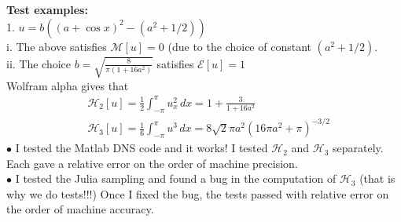 \documentclass[11pt]{article}
\newcommand{\vsp}[1]{\vspace{#1 pc} \noindent}
\newcommand{\seclabel}[1]{\vsp{1} {\bf#1:}}
\newcommand{\dx}{\, dx}
\newcommand{\En}{\mathcal{E}}
\newcommand{\Mo}{\mathcal{M}}
\newcommand{\Ham}{\mathcal{H}}
\newcommand{\Hthree}{\Ham_{3}}
\newcommand{\Htwo}{\Ham_{2}}
\begin{document}
\seclabel{Test examples} \\
1. $u = b \left( (a+\cos{x})^2 - (a^2+1/2) \right)$ \\
i. The above satisfies $\Mo[u] = 0$ (due to the choice of constant $(a^2 + 1/2)$. \\
ii. The choice $b = \sqrt{ \frac{8}{\pi(1+16 a^2)}}$ satisfies $\En[u] = 1$ \\
Wolfram alpha gives that
\begin{align}
&\Htwo[u] = \frac{1}{2} \int_{-\pi}^{\pi} u_x^2 \dx = 1 + \frac{3}{1+16 a^2} \\
&\Hthree[u] = \frac{1}{6} \int_{-\pi}^{\pi} u^3 \dx = 8 \sqrt{2} \pi a^2 \left( 16 \pi a^2 + \pi \right)^{-3/2}
\end{align}
$\bullet$ I tested the Matlab DNS code and it works! I tested $\Htwo$ and $\Hthree$ separately. Each gave a relative error on the order of machine precision. \\
$\bullet$ I tested the Julia sampling and found a bug in the computation of $\Hthree$ (that is why we do tests!!!) Once I fixed the bug, the tests passed with relative error on the order of machine accuracy.
\end{document}
